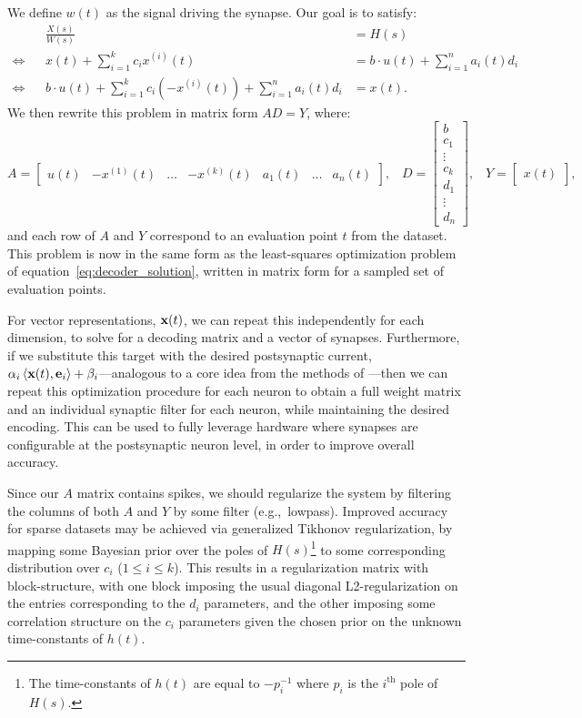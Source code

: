 We define ${w}(t)$ as the signal driving the synapse. Our goal is to satisfy:
\begin{align*}
    && \frac{{X}(s)}{{W}(s)} &= H(s) \\
    \iff && {x}(t) + \sum_{i=1}^k c_i {x}^{(i)}(t) &= {b} \cdot {u}(t) + \sum_{i=1}^n a_i(t) {d}_i \\
    \iff && {b} \cdot {u}(t) + \sum_{i=1}^k c_i \left(-{x}^{(i)}(t)\right) + \sum_{i=1}^n a_i(t) {d}_i &= {x}(t) \text{.}
\end{align*}
We then rewrite this problem in matrix form $AD = Y$, where:
$$A = \left[ \begin{matrix} {u}(t) & -{x}^{(1)}(t) & \ldots & -{x}^{(k)}(t) & a_1(t) & \ldots & a_n(t)  \end{matrix} \right] \text{,} \quad D = \left[ \begin{matrix} {b} \\ c_1 \\ \vdots \\ c_k \\ d_1 \\ \vdots \\ d_n \end{matrix} \right] \text{,} \quad Y = \left[ \begin{matrix} {x}(t) \end{matrix} \right]\text{,}$$
and each row of $A$ and $Y$ correspond to an evaluation point $t$ from the dataset.
This problem is now in the same form as the least-squares optimization problem of equation~\ref{eq:decoder_solution}, written in matrix form for a sampled set of evaluation points.

For vector representations, $\mathbf{x}(t)$, we can repeat this independently for each dimension, to solve for a decoding matrix and a vector of synapses. 
Furthermore, if we substitute this target with the desired postsynaptic current, $\alpha_i \left \langle \mathbf{x}(t)\text{,}\, \mathbf{e}_i \right \rangle + \beta_i$---analogous to a core idea from the methods of \citet{tripp2006neural, stoeckel2018}---then we can repeat this optimization procedure for each neuron to obtain a full weight matrix and an individual synaptic filter for each neuron, while maintaining the desired encoding.
This can be used to fully leverage hardware where synapses are configurable at the postsynaptic neuron level, in order to improve overall accuracy.

Since our $A$ matrix contains spikes, we should regularize the system by filtering the columns of both $A$ and $Y$ by some filter (e.g.,~lowpass).
Improved accuracy for sparse datasets may be achieved via generalized Tikhonov regularization, by mapping some Bayesian prior over the poles of $H(s)$\footnote{The time-constants of $h(t)$ are equal to $-p_i^{-1}$ where $p_i$ is the $i^\text{th}$ pole of $H(s)$.} to some corresponding distribution over $c_i$ ($1 \le i \le k$).
This results in a regularization matrix with block-structure, with one block imposing the usual diagonal L2-regularization on the entries corresponding to the $d_i$ parameters, and the other imposing some correlation structure on the $c_i$ parameters given the chosen prior on the unknown time-constants of $h(t)$.

